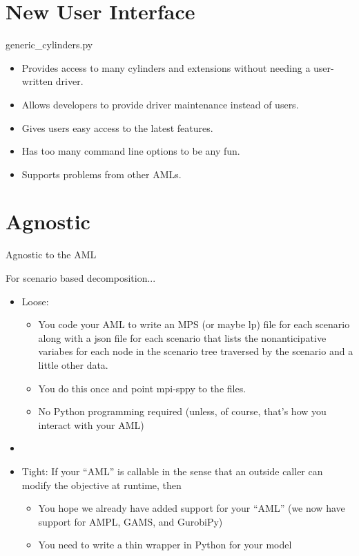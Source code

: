 \documentclass[9pt,usenames,dvipsnames]{beamer}
\begin{document}
\section{New User Interface}
\begin{frame}{generic\_cylinders.py}
  \begin{itemize}
  \item Provides access to many cylinders and extensions without needing a user-written driver.
  \item Allows developers to provide driver maintenance instead of users.
  \item Gives users easy access to the latest features.
    \item Has too many command line options to be any fun.
    \item Supports problems from other AMLs.
    \end{itemize}
\end{frame}

\section{Agnostic}
\begin{frame}{Agnostic to the AML}
  \subtitle{(or, really, ecumenical)}
  For scenario based decomposition...
  \begin{itemize}
  \item Loose:
    \begin{itemize}
    \item You code your AML to write an MPS (or maybe lp) file for each scenario along with a json file for each scenario that lists the nonanticipative variabes for each node in the scenario tree traversed by the scenario and a little other data.
    \item You do this once and point mpi-sppy to the files.
      \item No Python programming required (unless, of course, that's how you interact with your AML)
      \end{itemize}
    \item[]
    \item Tight: If your ``AML'' is callable in the sense that an outside caller
      can modify the objective at runtime, then
      \begin{itemize}
      \item You hope we already have added support for your ``AML'' (we now have support for AMPL, GAMS, and GurobiPy)
        \item You need to write a thin wrapper in Python for your model
        \end{itemize}
  \end{itemize}
\end{frame}
\end{document}
